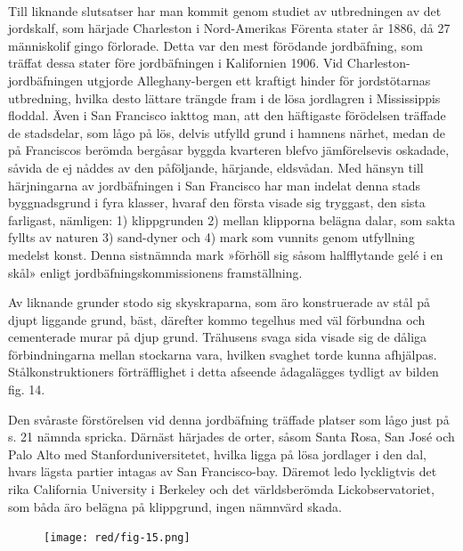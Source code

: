 \documentclass[a4paper, 12pt, oneside, swedish]{article}
\begin{document}
\paragraph{}
Till liknande slutsatser har man kommit genom studiet av utbredningen av det jordskalf, som härjade Charleston i Nord-Amerikas Förenta stater år 1886, då 27 människolif gingo förlorade. Detta var den mest förödande jordbäfning, som träffat dessa stater före jordbäfningen i Kalifornien 1906. Vid Charleston-jordbäfningen utgjorde Alleghany-bergen ett kraftigt hinder för jordstötarnas utbredning, hvilka desto lättare trängde fram i de lösa jordlagren i Mississippis floddal. Även i San Francisco iakttog man, att den häftigaste förödelsen träffade de stadsdelar, som lågo på lös, delvis utfylld grund i hamnens närhet, medan de på Franciscos berömda bergåsar byggda kvarteren blefvo jämförelsevis oskadade, såvida de ej nåddes av den påföljande, härjande, eldsvådan. Med hänsyn till härjningarna av jordbäfningen i San Francisco har man indelat denna stads byggnadsgrund i fyra klasser, hvaraf den första visade sig tryggast, den sista farligast, nämligen: 1) klippgrunden 2) mellan klipporna belägna dalar, som sakta fyllts av naturen 3) sand-dyner och 4) mark som vunnits genom utfyllning medelst konst. Denna sistnämnda mark »förhöll sig såsom halfflytande gelé i en skål» enligt jordbäfningskommissionens framställning.

Av liknande grunder stodo sig skyskraparna, som äro konstruerade av stål på djupt liggande grund, bäst, därefter kommo tegelhus med väl förbundna och cementerade murar på djup grund. Trähusens svaga sida visade sig de dåliga förbindningarna mellan stockarna vara, hvilken svaghet torde kunna afhjälpas. Stålkonstruktioners förträfflighet i detta afseende ådagalägges tydligt av bilden fig. 14.

Den svåraste förstörelsen vid denna jordbäfning träffade platser som lågo just på s. 21 nämnda spricka. Därnäst härjades de orter, såsom Santa Rosa, San José och Palo Alto med Stanforduniversitetet, hvilka ligga på lösa jordlager i den dal, hvars lägsta partier intagas av San Francisco-bay. Däremot ledo lyckligtvis det rika California University i Berkeley och det världsberömda Lickobservatoriet, som båda äro belägna på klippgrund, ingen nämnvärd skada.

\begin{figure}[H]
\centering
\texttt{[image: red/fig-15.png]}
\caption{}
\end{figure}
\end{document}
